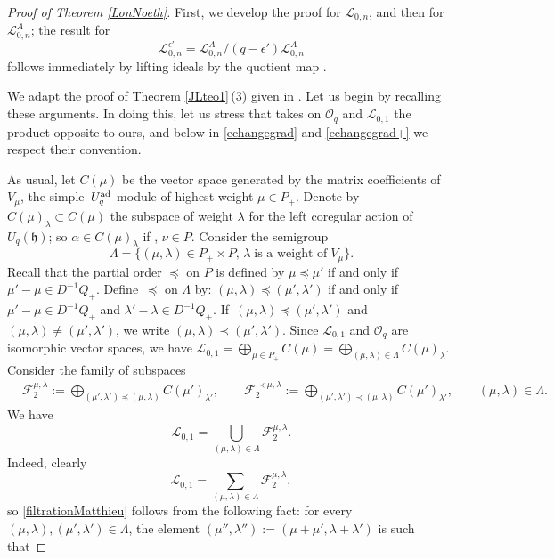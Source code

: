 \documentclass[10pt,a4paper]{amsart}
\numberwithin{equation}{section}
\theoremstyle{definition}
\newcommand{\ep}{{\epsilon'}}
\newcommand{\Ll}{{\mathcal L}}
\newcommand{\ra}{\rightarrow}
\begin{document}
\begin{proof}[Proof of Theorem \ref{LonNoeth}] First, we develop the proof for $\Ll_{0,n}$, and then for $\Ll_{0,n}^A$; the result for%
\[\Ll_{0,n}^\ep\!= \Ll_{0,n}^A/(q-\ep)\Ll_{0,n}^A
\]
 follows immediately by lifting ideals by the quotient map \smash{$\Ll_{0,n}^A \!\ra \Ll_{0,n}^\ep$}.

We adapt the proof of Theorem \ref{JLteo1}\,(3) given in \cite[Theorem 3.137]{VY}. Let us begin by recalling these arguments. In doing this, let us stress that \cite{VY} takes on ${\mathcal O}_q$ and $\Ll_{0,1}$ the product opposite to ours, and below in \eqref{echangegrad} and \eqref{echangegrad+} we respect their convention.

As usual, let $C(\mu)$ be the vector space generated by the matrix coefficients of $V_\mu$, the simple~$U_q^{\rm ad}$-module of highest weight $\mu \in P_+$. Denote by $C(\mu)_\lambda \subset C(\mu)$ the subspace of weight $\lambda$ for the left coregular action of $U_q({\mathfrak h})$; so $\alpha\in C(\mu)_\lambda$ if , $\nu\in P$. Consider the semigroup
\[\Lambda=\{(\mu, \lambda)\in P_+\times P, \, \lambda \;\text{is a weight of}\;V_\mu\}.\]
Recall that the partial order $\preceq$ on $P$ is defined by $\mu\preceq \mu'$ if and only if $\mu'-\mu\in D^{-1}Q_+$. Define~$\preceq$ on $\Lambda$ by: $(\mu,\lambda)\preceq (\mu', \lambda')$ if and only if $\mu'-\mu\in D^{-1}Q_+$ and $\lambda'-\lambda\in D^{-1}Q_+$. If~${(\mu,\lambda)\preceq (\mu', \lambda')}$ and $(\mu,\lambda)\ne (\mu', \lambda')$, we write $(\mu,\lambda)\prec (\mu', \lambda')$. Since ${\mathcal L}_{0,1}$ and ${\mathcal O}_q$ are isomorphic vector spaces, we have $ {\mathcal L}_{0,1}=\bigoplus_{\mu\in P_+} C(\mu)=\bigoplus_{(\mu,\lambda)\in \Lambda} C(\mu)_\lambda$. Consider the family of subspaces
\begin{align*}
& {\mathcal F}_2^{\mu,\lambda} :=\bigoplus_{(\mu',\lambda')\preceq (\mu,\lambda)} C(\mu')_{\lambda'} , \qquad{\mathcal F}_2^{\prec \mu,\lambda}:=\bigoplus_{(\mu',\lambda')\prec (\mu,\lambda)} C(\mu')_{\lambda'} , \qquad (\mu,\lambda)\in \Lambda.
\end{align*}
We have
\begin{equation}\label{filtrationMatthieu}
{\mathcal L}_{0,1} = \bigcup_{(\mu,\lambda)\in \Lambda} {\mathcal F}_2^{\mu,\lambda}.
\end{equation}
Indeed, clearly
\[ {\mathcal L}_{0,1} = \sum_{(\mu,\lambda)\in \Lambda} {\mathcal F}_2^{\mu,\lambda},
\]
 so \eqref{filtrationMatthieu} follows from the following fact: for every $(\mu,\lambda), (\mu',\lambda')\in \Lambda$, the element $(\mu'',\lambda''):= (\mu+\mu',\lambda+\lambda')$ is such that

\end{proof}
\end{document}
